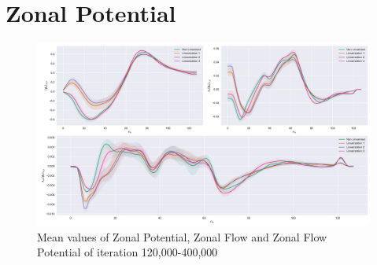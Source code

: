 \documentclass[master.tex]{subfiles}
\begin{document}
\section{Zonal Potential}


\begin{figure}[!htbp]
    \includegraphics[width=\linewidth]{pdfs/zonal_potential_low.pdf}
    \caption{Mean values of Zonal Potential, Zonal Flow and Zonal Flow Potential of iteration 120,000-400,000}
    \label{fig:zonal-potential-low-all}
\end{figure}
\end{document}
